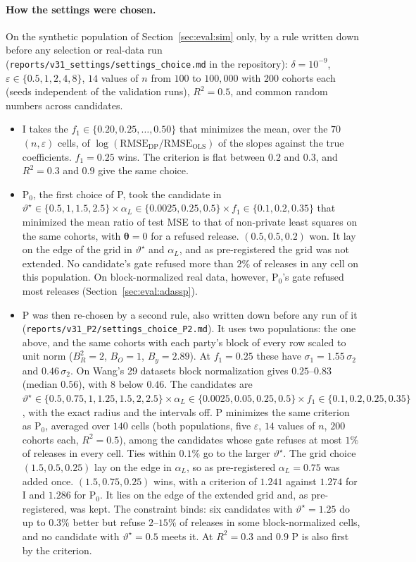 \documentclass[11pt]{article}
\theoremstyle{definition}
\theoremstyle{plain}
\newcommand{\btheta}{\boldsymbol{\theta}}
\begin{document}
\paragraph{How the settings were chosen.} On the synthetic population of Section~\ref{sec:eval:sim} only, by a rule written down before any selection or real-data run (\nolinkurl{reports/v31_settings/settings_choice.md} in the repository): $\delta = 10^{-9}$, $\varepsilon \in \{0.5, 1, 2, 4, 8\}$, $14$ values of $n$ from $100$ to $100{,}000$ with $200$ cohorts each (seeds independent of the validation runs), $R^2 = 0.5$, and common random numbers across candidates.
\begin{itemize}[noitemsep]
  \item I takes the $f_1 \in \{0.20, 0.25, \dots, 0.50\}$ that minimizes the mean, over the $70$ $(n, \varepsilon)$ cells, of $\log(\mathrm{RMSE}_{\mathrm{DP}}/\mathrm{RMSE}_{\mathrm{OLS}})$ of the slopes against the true coefficients. $f_1 = 0.25$ wins. The criterion is flat between $0.2$ and $0.3$, and $R^2 = 0.3$ and $0.9$ give the same choice.
  \item P$_0$, the first choice of P, took the candidate in $\vartheta^\star \in \{0.5, 1, 1.5, 2.5\} \times \alpha_L \in \{0.0025, 0.25, 0.5\} \times f_1 \in \{0.1, 0.2, 0.35\}$ that minimized the mean ratio of test MSE to that of non-private least squares on the same cohorts, with $\btheta = 0$ for a refused release. $(0.5, 0.5, 0.2)$ won. It lay on the edge of the grid in $\vartheta^\star$ and $\alpha_L$, and as pre-registered the grid was not extended. No candidate's gate refused more than $2\%$ of releases in any cell on this population. On block-normalized real data, however, P$_0$'s gate refused most releases (Section~\ref{sec:eval:adassp}).
  \item P was then re-chosen by a second rule, also written down before any run of it (\nolinkurl{reports/v31_P2/settings_choice_P2.md}). It uses two populations: the one above, and the same cohorts with each party's block of every row scaled to unit norm ($B_R^2 = 2$, $B_O = 1$, $B_y = 2.89$). At $f_1 = 0.25$ these have $\sigma_1 = 1.55\,\sigma_2$ and $0.46\,\sigma_2$. On Wang's 29 datasets block normalization gives $0.25$--$0.83$ (median $0.56$), with 8 below $0.46$. The candidates are $\vartheta^\star \in \{0.5, 0.75, 1, 1.25, 1.5, 2, 2.5\} \times \alpha_L \in \{0.0025, 0.05, 0.25, 0.5\} \times f_1 \in \{0.1, 0.2, 0.25, 0.35\}$, with the exact radius and the intervals off. P minimizes the same criterion as P$_0$, averaged over $140$ cells (both populations, five $\varepsilon$, $14$ values of $n$, $200$ cohorts each, $R^2 = 0.5$), among the candidates whose gate refuses at most $1\%$ of releases in every cell. Ties within $0.1\%$ go to the larger $\vartheta^\star$. The grid choice $(1.5, 0.5, 0.25)$ lay on the edge in $\alpha_L$, so as pre-registered $\alpha_L = 0.75$ was added once. $(1.5, 0.75, 0.25)$ wins, with a criterion of $1.241$ against $1.274$ for I and $1.286$ for P$_0$. It lies on the edge of the extended grid and, as pre-registered, was kept. The constraint binds: six candidates with $\vartheta^\star = 1.25$ do up to $0.3\%$ better but refuse $2$--$15\%$ of releases in some block-normalized cells, and no candidate with $\vartheta^\star = 0.5$ meets it. At $R^2 = 0.3$ and $0.9$ P is also first by the criterion.

\end{itemize}
\end{document}
